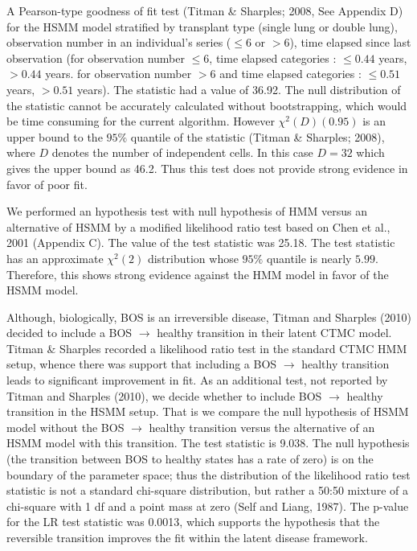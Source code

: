 \documentclass{uwstat572}
\begin{document}
A Pearson-type goodness of fit test (Titman \& Sharples; 2008, See Appendix D) for the HSMM  model stratified by transplant type (single lung or double lung), observation number in an individual’s series ($\leq 6$ or $>6$), time elapsed since last observation (for observation number $\leq 6$, time elapsed categories : $\leq 0.44$ years, $> 0.44$ years. for observation number $> 6$ and time elapsed categories : $\leq 0.51$ years, $> 0.51$ years). The statistic had a value of 36.92. The null distribution of the statistic cannot be accurately calculated without bootstrapping, which would be time consuming for the current algorithm. However $\chi^2(D) (0.95)$ is an upper bound to the $95\%$ quantile of the statistic (Titman \& Sharples; 2008), where $D$ denotes the number of independent cells. In this case $D = 32$ which gives the upper bound as 46.2. Thus this test does not provide strong evidence in favor of poor fit.

We performed an hypothesis test with null hypothesis of HMM versus an alternative of HSMM by a modified likelihood ratio test based on Chen et al., 2001 (Appendix C). The value of the test statistic was 25.18. The test statistic has an approximate $\chi^2(2)$ distribution whose $95\%$ quantile is nearly $5.99$. Therefore, this shows strong evidence against the HMM model in favor of the HSMM model.

Although, biologically, BOS is an irreversible disease, Titman and Sharples (2010) decided to include a BOS $\rightarrow$ healthy transition in their latent CTMC model. Titman \& Sharples recorded a likelihood ratio test in the standard CTMC HMM setup, whence there was support that including a BOS $\rightarrow$ healthy transition leads to significant improvement in fit. As an additional test, not reported by Titman and Sharples (2010), we decide whether to include BOS $\rightarrow$ healthy transition in the HSMM setup. That is we compare the null hypothesis of HSMM model without the BOS $\rightarrow$ healthy transition versus the alternative of an HSMM model with this transition. The test statistic is 9.038. The null hypothesis (the transition between BOS to healthy states has a rate of zero) is on the boundary of the parameter space; thus the distribution of the likelihood ratio test statistic is not a standard chi-square distribution, but rather a 50:50 mixture of a chi-square with 1 df and a point mass at zero (Self and Liang, 1987). The p-value for the LR test statistic was 0.0013, which supports the hypothesis that the reversible transition improves the fit within the latent disease framework.
\end{document}
